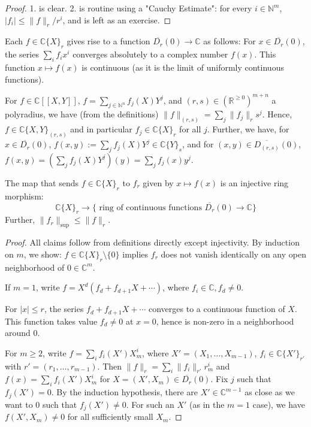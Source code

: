\begin{proof} %
1. is clear. 2. is routine using a "Cauchy Estimate": for every $i\in \mathbb{N}^m$, $|f_i|\leq \|f\|_r/r^i$,
and is left as an exercise.
 \end{proof}

Each $f\in\mathbb{C}\{X\}_r$ gives rise to a function $\overline{D_r}(0)\rightarrow\mathbb{C}$ as follows:
For $x\in\overline{D_r}(0)$, the series $\sum_i f_i x^i$ converges absolutely to a complex number $f(x)$.
This function $x\mapsto f(x)$ is continuous (as it is the limit of uniformly continuous functions).

For $f\in \mathbb{C}[[X,Y]]$, $f = \sum_{j\in \mathbb{N}^n} f_j(X) Y^j$, 
and $(r,s)\in (\mathbb{R}^{\geq 0})^{m+n}$ a polyradius, we have (from the definitions)
$\|f\|_{(r,s)} = \sum_j \|f_j\|_r s^j$.
Hence, $f\in \mathbb{C}\{X,Y\}_{(r,s)}$ and in particular $f_j\in \mathbb{C}\{X\}_r$ for all $j$.
Further, we have,
for $x\in \overline{D_r}(0)$, $f(x,y):= \sum_j f_j(X)Y^j\in \mathbb{C}\{Y\}_s$,
and for $(x,y)\in \overline{D_{(r,s)}}(0)$, $f(x,y) = \left( \sum_j f_j(X)Y^j\right)(y) = \sum_j f_j(x)y^j$.

\begin{lemma} %

The map that sends $f\in \mathbb{C}\{X\}_r$ to $f_r$ given by $x\mapsto f(x)$ is an injective ring morphism:
$$\mathbb{C}\{X\}_r \rightarrow \{\textrm{ ring of continuous functions } \overline{D_r}(0) \rightarrow \mathbb{C}\}$$
Further, $\|f_r\|_{\mathrm{sup}} \leq \|f\|_r$.
 \end{lemma}

\begin{proof} %

All claims follow from definitions directly except injectivity. By induction on $m$, we show:
$f\in \mathbb{C}\{X\}_r\setminus \{0\}$ implies $f_r$ does not vanish identically on any open neighborhood of $0\in \mathbb{C}^m$.

If $m=1$, write $f = X^d (f_d + f_{d+1} X + \cdots )$, where $f_i\in \mathbb{C}, f_d\neq 0$.

For $|x|\leq r$, the series $f_d + f_{d+1}X + \cdots $ converges to a continuous function of $X$.
This function takes value $f_d\neq 0$ at $x=0$, hence is non-zero in a neighborhood around $0$.

For $m\geq 2$, write $f = \sum_i f_i(X') X_m^i$, where $X' = (X_1,\ldots, X_{m-1})$, $f_i \in \mathbb{C}\{X'\}_{r'}$
with $r' = (r_1,\ldots, r_{m-1})$.
Then $\|f\|_r = \sum_i \|f_i\|_{r'} r_m^i$ and $f(x) = \sum_i f_i(X')X_m^i$ for $X = (X',X_m)\in \overline{D_r}(0)$.
Fix $j$ such that $f_j(X') = 0$. By the induction hypothesis, there are $X'\in \mathbb{C}^{m-1}$ as close as we want to $0$
such that $f_j(X')\neq 0$. For such an $X'$ (as in the $m=1$ case), we have $f(X',X_m)\neq 0$ for all sufficiently small $X_m$.
 \end{proof}

